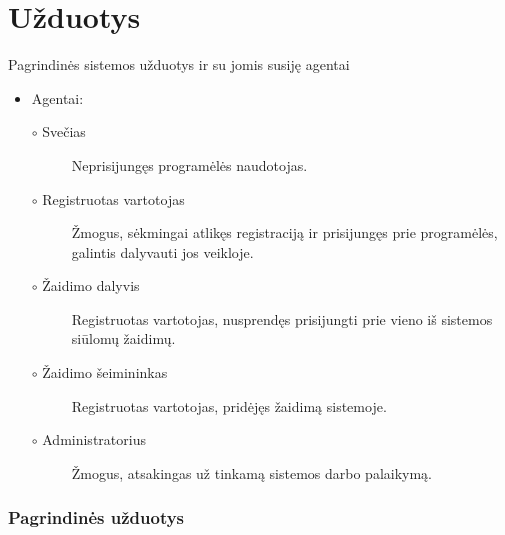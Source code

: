 \documentclass{VUMIFPSkursinis}
\begin{document}
\section{Užduotys}
Pagrindinės sistemos užduotys ir su jomis susiję agentai

	\renewcommand{\labelitemi}{$\bullet$}
	\renewcommand{\labelitemii}{$\circ$}
	\begin{itemize}
		\item Agentai:
			\begin{description}
				\item [$\circ$ Svečias] Neprisijungęs programėlės naudotojas.
				\item [$\circ$ Registruotas vartotojas] Žmogus, sėkmingai atlikęs registraciją ir prisijungęs prie programėlės, galintis dalyvauti jos veikloje.
				\item [$\circ$ Žaidimo dalyvis] Registruotas vartotojas, nusprendęs prisijungti prie vieno iš sistemos siūlomų žaidimų.
				\item [$\circ$ Žaidimo šeimininkas] Registruotas vartotojas, pridėjęs žaidimą sistemoje.
				\item [$\circ$ Administratorius] Žmogus, atsakingas už tinkamą sistemos darbo palaikymą.
			\end{description}
	\end{itemize}
		
	\subsubsection*{Pagrindinės užduotys}
	
\end{document}
